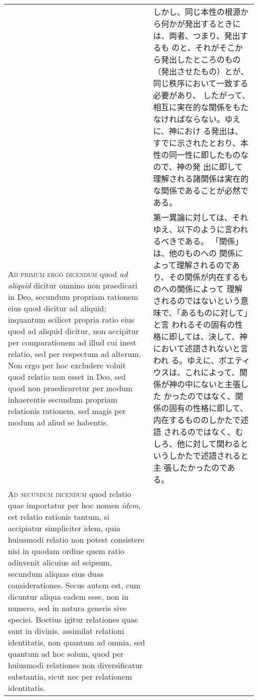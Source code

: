 \documentclass[10pt]{jsarticle} %
\begin{document}
\begin{longtable}{p{21em}p{21em}}
&

しかし、同じ本性の根源から何かが発出するときには、両者、つまり、発出するも
 のと、それがそこから発出したところのもの（発出させたもの）とが、同じ秩序において一致する必要があり、
 したがって、相互に実在的な関係をもたなければならない。ゆえに、神におけ
 る発出は、すでに示されたとおり、本性の同一性に即したものなので、神の発
 出に即して理解される諸関係は実在的な関係であることが必然である。

\\




{\scshape Ad primum ergo dicendum} quod {\itshape ad aliquid} dicitur omnino non praedicari in
Deo, secundum propriam rationem eius quod dicitur ad aliquid; inquantum
scilicet propria ratio eius quod ad aliquid dicitur, non accipitur per
comparationem ad illud cui inest relatio, sed per respectum ad
alterum. Non ergo per hoc excludere voluit quod relatio non esset in
Deo, sed quod non praedicaretur per modum inhaerentis secundum propriam
relationis rationem, sed magis per modum ad aliud se habentis.


&


第一異論に対しては、それゆえ、以下のように言われるべきである。
「関係」は、他のものへの
 関係によって理解されるのであり、その関係が内在するものへの関係によって
 理解されるのではないという意味で、「あるものに対して」と言
 われるその固有の性格に即しては、決して、神において述語されないと言われ
 る。ゆえに、ボエティウスは、これによって、関係が神の中にないと主張した
 かったのではなく、関係の固有の性格に即して、内在するもののしかたで述語
 されるのではなく、むしろ、他に対して関わるというしかたで述語されると主
 張したかったのである。


\\



{\scshape Ad secundum dicendum} quod relatio quae importatur per hoc nomen {\itshape idem},
est relatio rationis tantum, si accipiatur simpliciter idem, quia
huiusmodi relatio non potest consistere nisi in quodam ordine quem ratio
adinvenit alicuius ad seipsum, secundum aliquas eius duas
considerationes. Secus autem est, cum dicuntur aliqua eadem esse, non in
numero, sed in natura generis sive speciei. Boetius igitur relationes
quae sunt in divinis, assimilat relationi identitatis, non quantum ad
omnia, sed quantum ad hoc solum, quod per huiusmodi relationes non
diversificatur substantia, sicut nec per relationem identitatis.


&


\end{longtable}
\end{document}

